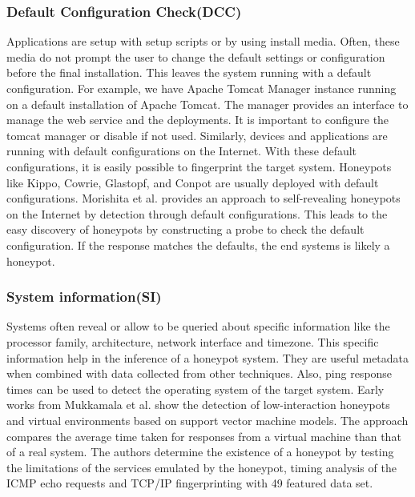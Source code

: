 \subsubsection{Default Configuration Check(DCC)}
Applications are setup with setup scripts or by using install media. Often, these media do not prompt the user to change the default settings or configuration before the final installation. This leaves the system running with a default configuration. For example, we have Apache Tomcat Manager instance running on a default installation of Apache Tomcat. The manager provides an interface to manage the web service and the deployments. It is important to configure the tomcat manager or disable if not used. Similarly, devices and applications are running with default configurations on the Internet. With these default configurations, it is easily possible to fingerprint the target system. Honeypots like Kippo, Cowrie, Glastopf, and Conpot are usually deployed with default configurations. Morishita et al. \cite{morishita} provides an approach to self-revealing honeypots on the Internet by detection through default configurations.  This leads to the easy discovery of honeypots by constructing a probe to check the default configuration. If the response matches the defaults, the end systems is likely a honeypot.
\newline
\subsubsection{System information(SI)}
Systems often reveal or allow to be queried about specific information like the processor family, architecture, network interface and timezone. This specific information help in the inference of a honeypot system. They are useful metadata when combined with data collected from other techniques.  Also, ping response times can be used to detect the operating system of the target system. Early works from Mukkamala et al. \cite{mukkamala} show the detection of low-interaction honeypots and virtual environments based on support vector machine models. The approach compares the average time taken for responses from a virtual machine than that of a real system. The authors determine the existence of a honeypot by testing the limitations of the services emulated by the honeypot, timing analysis of the ICMP echo requests and TCP/IP fingerprinting with 49 featured data set.  
\newline
